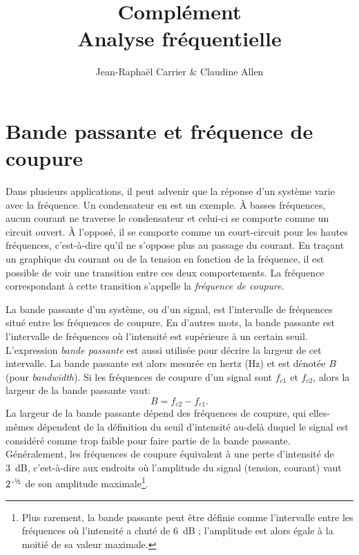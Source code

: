 \documentclass[canadien,12pt,oneside,letterpaper]{article}
\begin{document}
\title{\textbf{Complément}\\Analyse fréquentielle}
\author{Jean-Raphaël Carrier \& Claudine Allen}
\date{}
\maketitle


\section{Bande passante et fréquence de coupure}

Dans plusieurs applications, il peut advenir que la réponse d'un système varie avec la fréquence. Un condensateur en est un exemple. À basses fréquences, aucun courant ne traverse le condensateur et celui-ci se comporte comme un circuit ouvert. À l'opposé, il se comporte comme un court-circuit pour les hautes fréquences, c'est-à-dire qu'il ne s'oppose plus au passage du courant. En traçant un graphique du courant ou de la tension en fonction de la fréquence, il est possible de voir une transition entre ces deux comportements. La fréquence correspondant à cette transition s'appelle la \textit{fréquence de coupure}.

La bande passante d'un système, ou d'un signal, est l'intervalle de fréquences situé entre les fréquences de coupure. En d'autres mots, la bande passante est l'intervalle de fréquences où l'intensité est supérieure à un certain seuil. L'expression \textit{bande passante} est aussi utilisée pour décrire la largeur de cet intervalle. La bande passante est alors mesurée en hertz (Hz) et est dénotée $B$ (pour \textit{bandwidth}). Si les fréquences de coupure d'un signal sont $f_{c1}$ et $f_{c2}$, alors la largeur de la bande passante vaut:
\begin{equation}
B=f_{c2}-f_{c1}.
\end{equation}
%
La largeur de la bande passante dépend des fréquences de coupure, qui elles-mêmes dépendent de la définition du seuil d'intensité au-delà duquel le signal est considéré comme trop faible pour faire partie de la bande passante. Généralement, les fréquences de coupure équivalent à une perte d'intensité de 3~dB, c'est-à-dire aux endroits où l'amplitude du signal (tension, courant) vaut $2^{\,\text{-\textonehalf}}$ de son amplitude maximale\footnote{Plus rarement, la bande passante peut être définie comme l'intervalle entre les fréquences où l'intensité a chuté de 6~dB ; l'amplitude est alors égale à la moitié de sa valeur maximale.}.
\end{document}
